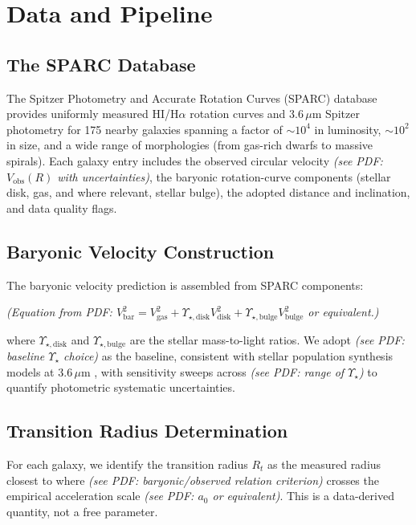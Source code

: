 \section{Data and Pipeline}


\subsection{The SPARC Database}
The Spitzer Photometry and Accurate Rotation Curves (SPARC) database \citep{Lelli2016SPARC} provides uniformly measured HI/H$\alpha$ rotation curves and $3.6\,\mu\mathrm{m}$ Spitzer photometry for 175 nearby galaxies spanning a factor of $\sim 10^4$ in luminosity, $\sim 10^2$ in size, and a wide range of morphologies (from gas-rich dwarfs to massive spirals). Each galaxy entry includes the observed circular velocity \emph{(see PDF: $V_{\mathrm{obs}}(R)$ with uncertainties)}, the baryonic rotation-curve components (stellar disk, gas, and where relevant, stellar bulge), the adopted distance and inclination, and data quality flags.

\subsection{Baryonic Velocity Construction}
The baryonic velocity prediction is assembled from SPARC components:

\emph{(Equation from PDF: $V_{\mathrm{bar}}^2 = V_{\mathrm{gas}}^2 + \Upsilon_{\star,\mathrm{disk}} V_{\mathrm{disk}}^2 + \Upsilon_{\star,\mathrm{bulge}} V_{\mathrm{bulge}}^2$ or equivalent.)}

where $\Upsilon_{\star,\mathrm{disk}}$ and $\Upsilon_{\star,\mathrm{bulge}}$ are the stellar mass-to-light ratios. We adopt \emph{(see PDF: baseline $\Upsilon_\star$ choice)} as the baseline, consistent with stellar population synthesis models at $3.6\,\mu\mathrm{m}$ \citep{McGaughSchombert2014}, with sensitivity sweeps across \emph{(see PDF: range of $\Upsilon_\star$)} to quantify photometric systematic uncertainties.

\subsection{Transition Radius Determination}
For each galaxy, we identify the transition radius $R_t$ as the measured radius closest to where \emph{(see PDF: baryonic/observed relation criterion)} crosses the empirical acceleration scale \emph{(see PDF: $a_0$ or equivalent)}. This is a data-derived quantity, not a free parameter.

